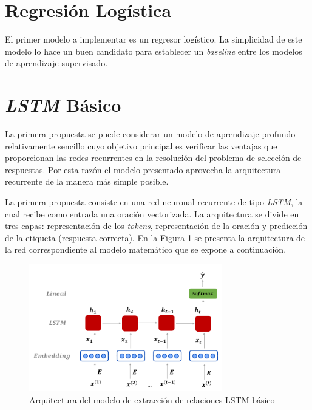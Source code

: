 \section{Regresión Logística}

El primer modelo a implementar es un regresor logístico. La simplicidad de este modelo lo hace un buen candidato para establecer un \textit{baseline} entre los modelos de aprendizaje supervisado.


\section{\textit{LSTM} Básico}\label{lstm_t}

La primera propuesta se puede considerar un modelo de aprendizaje profundo relativamente sencillo cuyo objetivo principal es verificar las ventajas que proporcionan las redes recurrentes en la resolución del problema de selección de respuestas. Por esta razón el modelo presentado aprovecha la arquitectura recurrente de la manera más simple posible.

La primera propuesta consiste en una red neuronal recurrente de tipo \textit{LSTM}, la cual recibe como entrada una oración vectorizada. La arquitectura se divide en tres capas: representación de los \textit{tokens}, representación de la oración y predicción de la etiqueta (respuesta correcta). En la Figura \ref{lstm} se presenta la arquitectura de la red correspondiente al modelo matemático que se expone a continuación.

\begin{figure}[!tb]
  \begin{center}    
    \includegraphics[angle=0, width=0.75\textwidth]{Graphics/lstm2.png} 
  \end{center}
    \caption{Arquitectura del modelo de extracción de relaciones LSTM básico}\label{lstm}
\end{figure}

